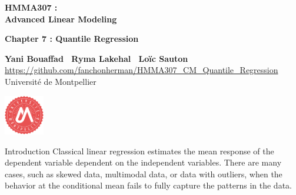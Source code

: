 \documentclass[unknownkeysallowed]{beamer}
\begin{document}



\begin{frame}
\bigskip
\bigskip
\begin{center}{
\LARGE\color{marron}
\textbf{HMMA307 : \\ Advanced Linear Modeling}
\textbf{ }\\
\vspace{0.5cm}
}

\color{marron}
\textbf{Chapter 7 : Quantile Regression}
\end{center}

\vspace{0.5cm}

\begin{center}
\textbf{Yani Bouaffad \ Ryma Lakehal \ Loïc Sauton} \\
\vspace{0.1cm}
\url{https://github.com/fanchonherman/HMMA307_CM_Quantile_Regression}\\
\vspace{0.5cm}
Université de Montpellier \\
\end{center}

\centering
\includegraphics[width=0.13\textwidth]{Logo}

\end{frame}

\begin{frame}{Introduction}
\vspace{0.2cm}
Classical linear regression estimates the mean response of the dependent variable dependent on the independent variables. There are many cases, such as skewed data, multimodal data, or data with outliers, when the behavior at the conditional mean fails to fully capture the patterns in the data.
\vspace{0.2cm}
\\
\end{frame}
\end{document}

